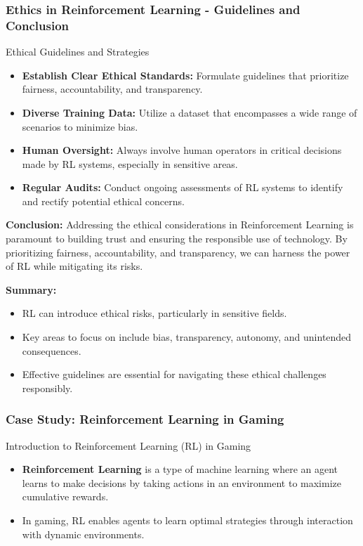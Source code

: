 \documentclass[aspectratio=169]{beamer}
\begin{document}
\begin{frame}[fragile]
    \frametitle{Ethics in Reinforcement Learning - Guidelines and Conclusion}
    \begin{block}{Ethical Guidelines and Strategies}
        \begin{itemize}
            \item \textbf{Establish Clear Ethical Standards:} Formulate guidelines that prioritize fairness, accountability, and transparency.
            \item \textbf{Diverse Training Data:} Utilize a dataset that encompasses a wide range of scenarios to minimize bias.
            \item \textbf{Human Oversight:} Always involve human operators in critical decisions made by RL systems, especially in sensitive areas.
            \item \textbf{Regular Audits:} Conduct ongoing assessments of RL systems to identify and rectify potential ethical concerns.
        \end{itemize}
    \end{block}

    \textbf{Conclusion:} Addressing the ethical considerations in Reinforcement Learning is paramount to building trust and ensuring the responsible use of technology. By prioritizing fairness, accountability, and transparency, we can harness the power of RL while mitigating its risks.

    \textbf{Summary:}
    \begin{itemize}
        \item RL can introduce ethical risks, particularly in sensitive fields.
        \item Key areas to focus on include bias, transparency, autonomy, and unintended consequences.
        \item Effective guidelines are essential for navigating these ethical challenges responsibly.
    \end{itemize}
\end{frame}

\begin{frame}[fragile]
  \frametitle{Case Study: Reinforcement Learning in Gaming}
  \begin{block}{Introduction to Reinforcement Learning (RL) in Gaming}
    \begin{itemize}
      \item \textbf{Reinforcement Learning} is a type of machine learning where an agent learns to make decisions by taking actions in an environment to maximize cumulative rewards.
      \item In gaming, RL enables agents to learn optimal strategies through interaction with dynamic environments.
    \end{itemize}
  \end{block}
\end{frame}
\end{document}
